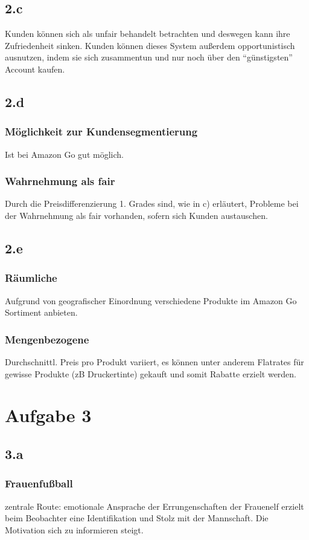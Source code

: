 \documentclass{article}
\begin{document}
\subsection{2.c}
Kunden können sich als unfair behandelt betrachten und deswegen kann ihre Zufriedenheit sinken. Kunden können dieses System außerdem opportunistisch ausnutzen, indem sie sich zusammentun und nur noch über den "`günstigsten"' Account kaufen.

\subsection{2.d}
\subsubsection{Möglichkeit zur Kundensegmentierung}
Ist bei Amazon Go gut möglich. 

\subsubsection{Wahrnehmung als fair}
Durch die Preisdifferenzierung 1. Grades sind, wie in c) erläutert, Probleme bei der Wahrnehmung als fair vorhanden, sofern sich Kunden austauschen.

\subsection{2.e}
\subsubsection{Räumliche}
Aufgrund von geografischer Einordnung verschiedene Produkte im Amazon Go Sortiment anbieten.
\subsubsection{Mengenbezogene}
Durchschnittl. Preis pro Produkt variiert, es können unter anderem Flatrates für gewisse Produkte (zB Druckertinte) gekauft und somit Rabatte erzielt werden.

\section{Aufgabe 3}
\subsection{3.a} 
\subsubsection{Frauenfußball}
zentrale Route: emotionale Ansprache der Errungenschaften der Frauenelf erzielt beim Beobachter eine Identifikation und Stolz mit der Mannschaft. Die Motivation sich zu informieren steigt.
\end{document}
